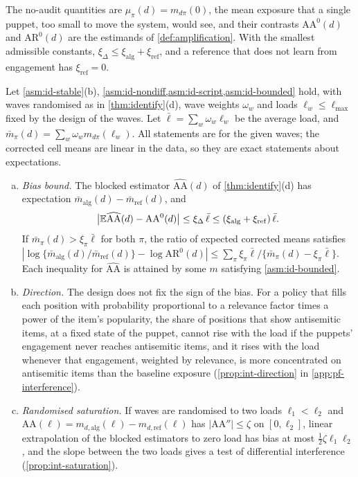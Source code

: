 The no-audit quantities are $\mu_\pi(d)=m_{d\pi}(0)$, the mean exposure that a single puppet, too small to move the system, would see, and their contrasts $\mathrm{AA}^0(d)$ and $\mathrm{AR}^0(d)$ are the estimands of \cref{def:amplification}. With the smallest admissible constants, $\xi_\Delta\le\xi_{\mathrm{alg}}+\xi_{\mathrm{ref}}$, and a reference that does not learn from engagement has $\xi_{\mathrm{ref}}=0$.

\begin{proposition}\label{prop:interference}
Let \cref{asm:id-stable}(b), \cref{asm:id-nondiff,asm:id-script,asm:id-bounded} hold, with waves randomised as in \cref{thm:identify}(d), wave weights $\omega_w$ and loads $\ell_w\le\ell_{\max}$ fixed by the design of the waves. Let $\bar\ell=\sum_w\omega_w\ell_w$ be the average load, and $\bar m_\pi(d)=\sum_w\omega_wm_{d\pi}(\ell_w)$. All statements are for the given waves; the corrected cell means are linear in the data, so they are exact statements about expectations.
\begin{enumerate}[(a)]
  \item \emph{Bias bound.} The blocked estimator $\widehat{\mathrm{AA}}(d)$ of \cref{thm:identify}(d) has expectation $\bar m_{\mathrm{alg}}(d)-\bar m_{\mathrm{ref}}(d)$, and
  \[
    \bigl|\mathbb{E}\widehat{\mathrm{AA}}(d)-\mathrm{AA}^0(d)\bigr|\le\xi_\Delta\,\bar\ell\le(\xi_{\mathrm{alg}}+\xi_{\mathrm{ref}})\,\bar\ell .
  \]
  If $\bar m_\pi(d)>\xi_\pi\bar\ell$ for both $\pi$, the ratio of expected corrected means satisfies $|\log\{\bar m_{\mathrm{alg}}(d)/\bar m_{\mathrm{ref}}(d)\}-\log\mathrm{AR}^0(d)|\le\sum_\pi\xi_\pi\bar\ell/\{\bar m_\pi(d)-\xi_\pi\bar\ell\}$. Each inequality for $\widehat{\mathrm{AA}}$ is attained by some $m$ satisfying \cref{asm:id-bounded}.
  \item \emph{Direction.} The design does not fix the sign of the bias. For a policy that fills each position with probability proportional to a relevance factor times a power of the item's popularity, the share of positions that show antisemitic items, at a fixed state of the puppet, cannot rise with the load if the puppets' engagement never reaches antisemitic items, and it rises with the load whenever that engagement, weighted by relevance, is more concentrated on antisemitic items than the baseline exposure (\cref{prop:int-direction} in \cref{app:pf-interference}).
  \item \emph{Randomised saturation.} If waves are randomised to two loads $\ell_1<\ell_2$ and $\mathrm{AA}(\ell)=m_{d,\mathrm{alg}}(\ell)-m_{d,\mathrm{ref}}(\ell)$ has $|\mathrm{AA}''|\le\zeta$ on $[0,\ell_2]$, linear extrapolation of the blocked estimators to zero load has bias at most $\frac12\zeta\ell_1\ell_2$, and the slope between the two loads gives a test of differential interference (\cref{prop:int-saturation}).

\end{enumerate}
\end{proposition}
